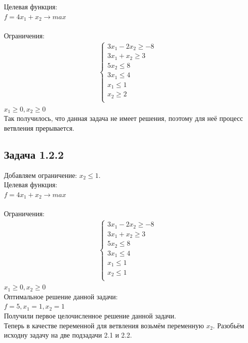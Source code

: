\documentclass[14pt,a4paper,fleqn]{extarticle}
\begin{document}
	Целевая функция:\\
	$f = 4x_1+x_2 \longrightarrow max$\\\\
	Ограничения:
	\begin{align*}
		\begin{cases}
			3x_1 - 2x_2 \geq -8\\
			3x_1 + x_2 \geq 3\\
			5 x_2 \leq 8\\
			3 x_1 \leq 4\\
			x_1 \leq 1\\
			x_2 \geq 2\\
		\end{cases}
	\end{align*}
	$x_1 \geq 0, x_2 \geq 0$\\
	Так получилось, что данная задача не имеет решения, поэтому для неё процесс ветвления прерывается.\\
	\newpage
	\subsection*{Задача 1.2.2}
	Добавляем ограничение: $x_2 \leq 1$.\\
	
	Целевая функция:\\
	$f = 4x_1+x_2 \longrightarrow max$\\\\
	Ограничения:
	\begin{align*}
		\begin{cases}
			3x_1 - 2x_2 \geq -8\\
			3x_1 + x_2 \geq 3\\
			5 x_2 \leq 8\\
			3 x_1 \leq 4\\
			x_1 \leq 1\\
			x_2 \leq 1\\
		\end{cases}
	\end{align*}
	$x_1 \geq 0, x_2 \geq 0$\\
	
	Оптимальное решение данной задачи:\\
	\underline{$f = 5, x_1 = 1, x_2 = 1$}\\
	
	Получили первое целочисленное решение данной задачи.\\
	
	Теперь в качестве переменной для ветвления возьмём переменную $x_2$. Разобьём исходну задачу на две подзадачи 2.1 и 2.2.
	\newpage
\end{document}
